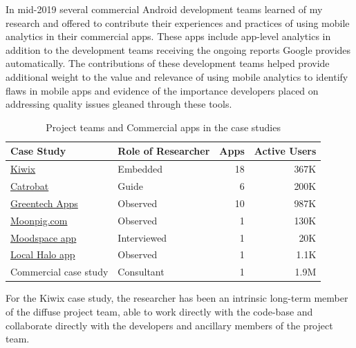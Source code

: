 In mid-2019 several commercial Android development teams learned of my research and offered to contribute their experiences and practices of using mobile analytics in their commercial apps. These apps include app-level analytics in addition to the development teams receiving the ongoing reports Google provides automatically. The contributions of these development teams helped provide additional weight to the value and relevance of using mobile analytics to identify flaws in mobile apps and evidence of the importance developers placed on addressing quality issues gleaned through these tools.


\begin{table}[htbp!]
    \centering
    \small
    \setlength{\tabcolsep}{4pt} %
    \begin{tabular}{llrr}
      Case Study &Role of Researcher &Apps &Active Users\\
      \hline
       \href{https://play.google.com/store/apps/dev?id=9116215767541857492&hl=en_GB}{Kiwix}  &Embedded &18 &367K\\
       \href{https://play.google.com/store/apps/developer?id=Catrobat&hl=en_GB}{Catrobat} &Guide &6 &200K\\
       \href{https://play.google.com/store/apps/dev?id=7665838187257770408}{Greentech Apps} &Observed &10 &987K\\
       \href{https://play.google.com/store/apps/developer?id=Moonpig.com&hl=en_GB}{Moonpig.com} &Observed &1 &130K\\
       \href{https://play.google.com/store/apps/details?id=boundless.moodgym&hl=en_GB}{Moodspace app} &Interviewed &1 &20K\\
       \href{https://play.google.com/store/apps/details?id=com.localhalo.app&hl=en_GB}{Local Halo app} &Observed &1 &1.1K\\
       Commercial case study &Consultant &1 &1.9M\\
    \end{tabular}
    \caption{Project teams and Commercial apps in the case studies}
    \label{tab:case_studies}
\end{table}

For the Kiwix case study, the researcher has been an intrinsic long-term member of the diffuse project team, able to work directly with the code-base and collaborate directly with the developers and ancillary members of the project team. 

